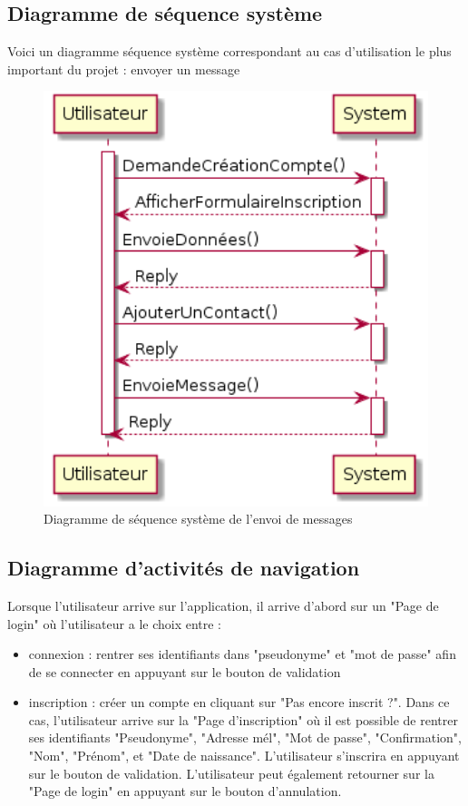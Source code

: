 \documentclass[a4paper,12pt]{article}
\begin{document}
	\subsection{Diagramme de séquence système}
	Voici un diagramme séquence système correspondant au cas d'utilisation le plus important du projet : envoyer un message
	\begin{figure}[H]
		\centerline{\includegraphics[width=12.5cm]{../diagrammes/img/sequenceSystemeEnvoiMessage.png}}
		\caption{Diagramme de séquence système de l'envoi de messages}
	\end{figure}

	\newpage

	\subsection{Diagramme d'activités de navigation}
	Lorsque l'utilisateur arrive sur l'application, il arrive d'abord sur un "Page de login" où l'utilisateur a le choix entre :
	\begin{itemize}
		\item connexion : rentrer ses identifiants dans "pseudonyme" et "mot de passe" afin de se connecter en appuyant sur le bouton de validation
		\item inscription : créer un compte en cliquant sur "Pas encore inscrit ?".
		Dans ce cas, l'utilisateur arrive sur la "Page d'inscription" où il est possible de rentrer ses identifiants "Pseudonyme", "Adresse mél", "Mot de passe", "Confirmation", "Nom", "Prénom", et "Date de naissance".
		L'utilisateur s'inscrira en appuyant sur le bouton de validation.
		L'utilisateur peut également retourner sur la "Page de login" en appuyant sur le bouton d'annulation.\\
	\end{itemize}
\end{document}
